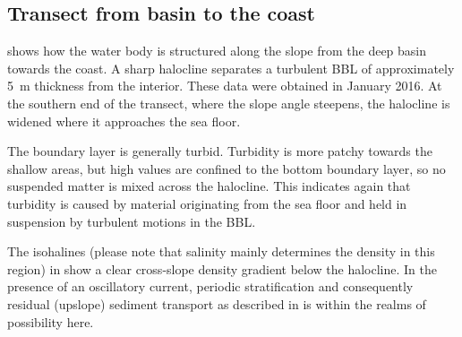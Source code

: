 \subsection{Transect from basin to the coast}

 shows how the water body is structured along the 
slope from the deep basin towards the coast. A sharp halocline separates a 
turbulent 
BBL of approximately 5~m thickness from the interior. These 
data were obtained in January 2016. At the southern end of the transect, where 
the slope angle steepens, the halocline is widened where it approaches the sea 	
floor. 

The boundary layer is generally turbid. Turbidity is more patchy towards the 
shallow areas, but high values are confined to the bottom boundary layer, 
so no suspended matter is mixed across the halocline. This indicates again that 
turbidity is caused by material originating from the sea floor and held in 
suspension by turbulent motions in the BBL.
% 

The isohalines (please note that salinity mainly determines 
the density in this region) in  show a clear cross-slope density 
gradient below the halocline. %
In the presence of an oscillatory current, periodic stratification and 
consequently residual (upslope) sediment transport as described in 
\cite{schulzumlauf2016} is within the realms of possibility here.

